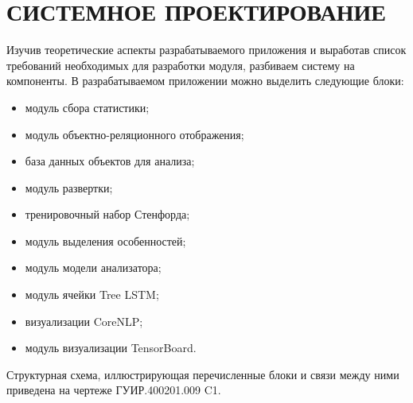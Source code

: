 \section{СИСТЕМНОЕ ПРОЕКТИРОВАНИЕ}\label{sec:sys}
Изучив теоретические аспекты разрабатываемого приложения и выработав список требований необходимых для разработки модуля, разбиваем систему на компоненты.
В разрабатываемом приложении можно выделить следующие блоки:
\begin{itemize}
\item модуль сбора статистики;
\item модуль объектно-реляционного отображения;
\item база данных объектов для анализа;
\item модуль развертки;
\item тренировочный набор Стенфорда;
\item модуль выделения особенностей;
\item модуль модели анализатора;
\item модуль ячейки Tree LSTM\@;
\item визуализации CoreNLP\@;
\item модуль визуализации TensorBoard.
\end{itemize}
Структурная схема, иллюстрирующая перечисленные блоки и связи между ними приведена на чертеже ГУИР.400201.009 C1.



